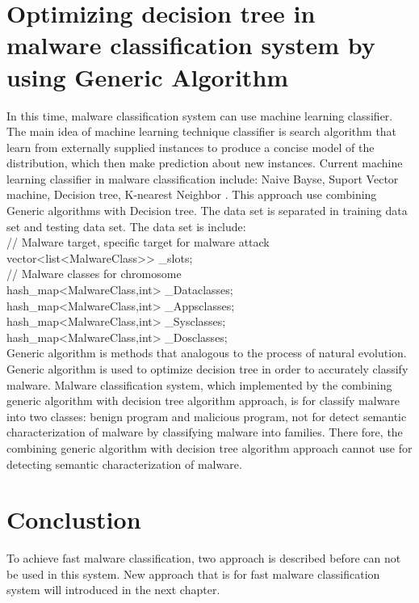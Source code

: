 \section{Optimizing decision tree in malware classification system by using Generic Algorithm}
In this time, malware classification system can use machine learning classifier. The main idea of machine learning technique classifier is search algorithm that learn from externally supplied instances to produce a concise model of the distribution, which then  make prediction about new  instances. Current machine learning classifier in malware classification include: Naive Bayse, Suport Vector machine, Decision tree, K-nearest Neighbor \cite{mohd}. This approach use combining Generic algorithms with Decision tree. The data set is separated in training data set and testing data set. The data set is include:\\
// Malware target, specific target for malware attack\\
vector<list<MalwareClass\*>> \_slots;\\

// Malware classes for chromosome\\
hash\_map<MalwareClass\*,int> \_Dataclasses;\\
hash\_map<MalwareClass\*,int> \_Appsclasses;\\
hash\_map<MalwareClass\*,int> \_Sysclasses;\\
hash\_map<MalwareClass\*,int> \_Dosclasses;\\

Generic algorithm is methods that analogous to the process of natural evolution. Generic algorithm is used to optimize decision tree in order to accurately classify malware. Malware classification system, which implemented by the combining generic algorithm with decision tree algorithm approach, is for classify malware into two classes: benign program and malicious program, not for detect semantic characterization of malware by classifying malware into families. There fore, the combining generic algorithm with decision tree algorithm approach cannot use for detecting semantic characterization of malware.
\section{Conclustion}
To achieve fast malware classification, two approach is described before can not be used in this system. New approach that is for fast malware classification system will introduced in the next chapter. 